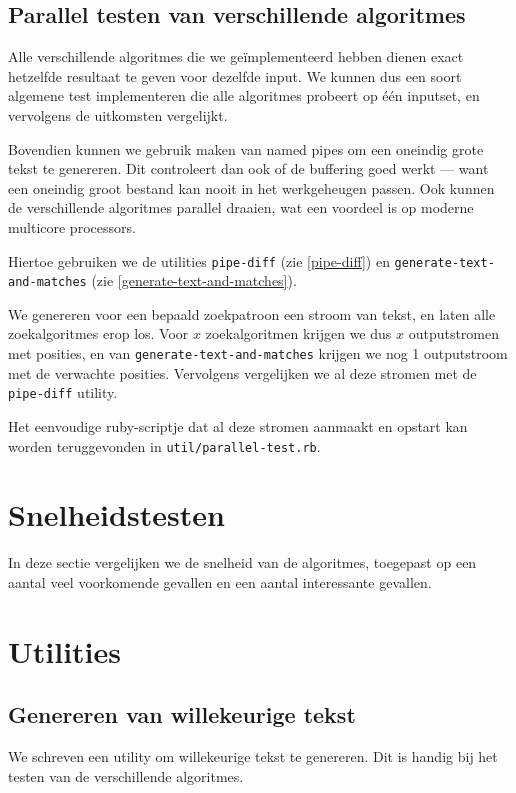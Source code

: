 \documentclass[a4paper,11pt]{article}
\begin{document}
\subsection{Parallel testen van verschillende algoritmes}

Alle verschillende algoritmes die we ge\"implementeerd hebben dienen exact
hetzelfde resultaat te geven voor dezelfde input. We kunnen dus een soort
algemene test implementeren die alle algoritmes probeert op \'e\'en inputset, en
vervolgens de uitkomsten vergelijkt.

Bovendien kunnen we gebruik maken van named pipes om een oneindig grote tekst
te genereren. Dit controleert dan ook of de buffering goed werkt — want een
oneindig groot bestand kan nooit in het werkgeheugen passen. Ook kunnen de
verschillende algoritmes parallel draaien, wat een voordeel is op moderne
multicore processors.

Hiertoe gebruiken we de utilities \verb#pipe-diff# (zie \ref{pipe-diff}) en
\verb#generate-text-and-matches# (zie \ref{generate-text-and-matches}).

We genereren voor een bepaald zoekpatroon een stroom van tekst, en laten
alle zoekalgoritmes erop los. Voor $x$ zoekalgoritmen krijgen we dus $x$
outputstromen met posities, en van \verb#generate-text-and-matches# krijgen we
nog 1 outputstroom met de verwachte posities. Vervolgens vergelijken we al deze
stromen met de \verb#pipe-diff# utility.

Het eenvoudige ruby-scriptje dat al deze stromen aanmaakt en opstart kan worden
teruggevonden in \verb#util/parallel-test.rb#.

\section{Snelheidstesten}

In deze sectie vergelijken we de snelheid van de algoritmes, toegepast op een
aantal veel voorkomende gevallen en een aantal interessante gevallen.

\section{Utilities}

\subsection{Genereren van willekeurige tekst}

We schreven een utility om willekeurige tekst te genereren. Dit is handig bij
het testen van de verschillende algoritmes.
\end{document}
